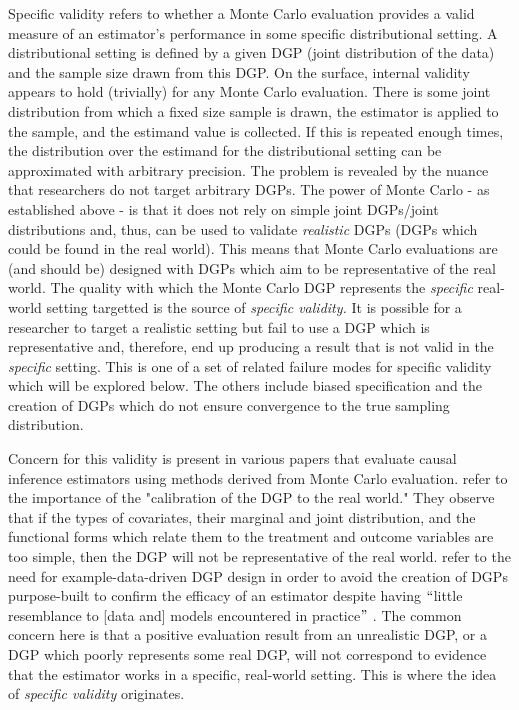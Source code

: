 \documentclass[../main.tex]{subfiles}
\begin{document}
Specific validity refers to whether a Monte Carlo evaluation provides a valid measure of an estimator’s performance in some specific distributional setting. A distributional setting is defined by a given DGP (joint distribution of the data) and the sample size drawn from this DGP. On the surface, internal validity appears to hold (trivially) for any Monte Carlo evaluation. There is some joint distribution from which a fixed size sample is drawn, the estimator is applied to the sample, and the estimand value is collected. If this is repeated enough times, the distribution over the estimand for the distributional setting can be approximated with arbitrary precision. The problem is revealed by the nuance that researchers do not target arbitrary DGPs. The power of Monte Carlo - as established above - is that it does not rely on simple joint DGPs/joint distributions and, thus, can be used to validate \textit{realistic} DGPs (DGPs which could be found in the real world). This means that Monte Carlo evaluations are (and should be) designed with DGPs which aim to be representative of the real world. The quality with which the Monte Carlo DGP represents the \textit{specific }real-world setting targetted is the source of \textit{specific validity. }It is possible for a researcher to target a realistic setting but fail to use a DGP which is representative and, therefore, end up producing a result that is not valid in the \textit{specific }setting. This is one of a set of related failure modes for specific validity which will be explored below. The others include biased specification and the creation of DGPs which do not ensure convergence to the true sampling distribution.\par


\vspace{\baselineskip}
Concern for this validity is present in various papers that evaluate causal inference estimators using methods derived from Monte Carlo evaluation. \textcite{Dorie2019Automated1} refer to the importance of the "calibration of the DGP to the real world." They observe that if the types of covariates, their marginal and joint distribution, and the functional forms which relate them to the treatment and outcome variables are too simple, then the DGP will not be representative of the real world. \textcite{Paxton2001MonteImplementation} refer to the need for example-data-driven DGP design in order to avoid the creation of DGPs purpose-built to confirm the efficacy of an estimator despite having $``$little resemblance to [data and] models encountered in practice$"$ . The common concern here is that a positive evaluation result from an unrealistic DGP, or a DGP which poorly represents some real DGP, will not correspond to evidence that the estimator works in a specific, real-world setting. This is where the idea of \textit{specific validity }originates.\par
\end{document}
